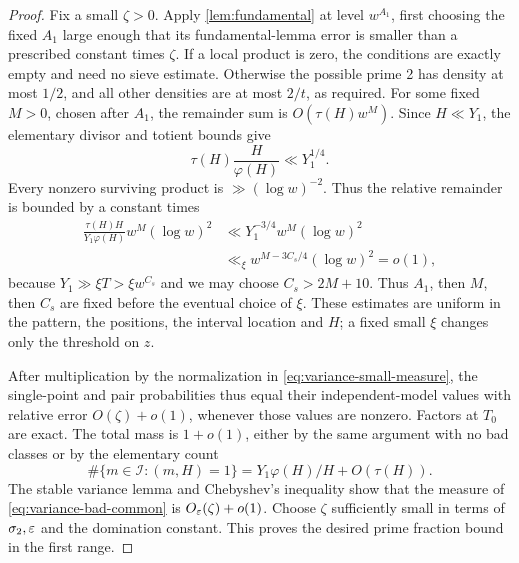 \begin{proof}
Fix a small \(\zeta>0\). Apply \cref{lem:fundamental} at level
\(w^{A_1}\), first choosing the fixed \(A_1\) large enough that its
fundamental-lemma error is smaller than a prescribed constant times
\(\zeta\). If a local product is zero, the conditions are exactly empty
and need no sieve estimate. Otherwise the possible prime 2 has density
at most \(1/2\), and all other densities are at most \(2/t\), as required.
For some fixed \(M>0\), chosen after \(A_1\), the remainder sum is
\(O(\tau(H)w^M)\). Since \(H\ll Y_1\), the elementary divisor and
totient bounds give
\[
 \tau(H)\frac{H}{\varphi(H)}\ll Y_1^{1/4}.
\]
Every nonzero surviving product is \(\gg(\log w)^{-2}\). Thus the
relative remainder is bounded by a constant times
\[
 \begin{aligned}
 \frac{\tau(H)H}{Y_1\varphi(H)}w^M(\log w)^2
 &\ll Y_1^{-3/4}w^M(\log w)^2\\
 &\ll_{\xi}w^{M-3C_s/4}(\log w)^2=o(1),
 \end{aligned}
\]
because \(Y_1\gg\xi T>\xi w^{C_s}\) and we may choose
\(C_s>2M+10\). Thus \(A_1\), then \(M\), then \(C_s\) are fixed
before the eventual choice of \(\xi\). These estimates are uniform in
the pattern, the positions, the interval location and \(H\); a fixed
small \(\xi\) changes only the threshold on \(z\).

After multiplication by the normalization in
\eqref{eq:variance-small-measure}, the single-point and pair probabilities
thus equal their independent-model values with relative error
\(O(\zeta)+o(1)\), whenever those values are nonzero. Factors at \(T_0\)
are exact. The total mass is \(1+o(1)\), either by the same argument with
no bad classes or by the elementary count
\[
 \#\{m\in\mathcal I:(m,H)=1\}
 =Y_1\varphi(H)/H+O(\tau(H)).
\]
The stable variance lemma and Chebyshev's inequality show that the
measure of \eqref{eq:variance-bad-common} is
\(O_\varepsilon(\zeta)+o(1)\). Choose \(\zeta\) sufficiently small in terms of
\(\sigma_2,\varepsilon\) and the domination constant. This proves the desired
prime fraction bound in the first range.


\end{proof}
